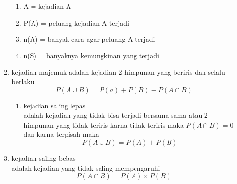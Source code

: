 \documentclass[11pt]{article}
\begin{document}
\begin{enumerate}
\begin{enumerate}
\begin{enumerate}
            \item A = kejadian A 
            \item P(A) = peluang kejadian A terjadi
            \item n(A) = banyak cara agar peluang A terjadi
            \item n(S) = banyaknya kemungkinan yang terjadi
        \end{enumerate}
        \item kejadian majemuk
        adalah kejadian 2 himpunan yang beriris dan selalu berlaku
        $$P(A \cup B ) = P(a)+P(B) - P(A \cap B)$$
        \begin{enumerate}
            \item kejadian saling lepas\\
            adalah kejadian yang tidak bisa terjadi bersama sama atau 2 himpunan yang tidak teriris
            karna tidak teriris maka $P(A\cap B) = 0$ dan karna terpisah maka
            $$P(A \cup B) = P(A) + P(B)$$
        \end{enumerate}
        \item kejadian saling bebas
        \\ adalah kejadian yang tidak saling mempengaruhi
        $$P(A\cap B) = P(A)\times P(B)$$
        
    \end{enumerate}
\end{enumerate}
\end{document}
